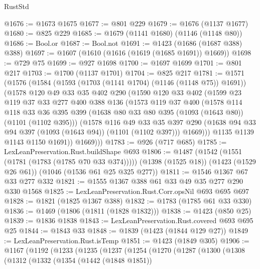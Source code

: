 \begin{lexlean}{RustStd}
\begin{coremodule}
@1676 := @1673 @1675
@1677 := @801 @229
@1679 := @1676 (@1137 @1677)
@1680 := @825 @229
@1685 := @1679 (@1141 @1680) (@1146 (@1148 @80))
@1686 := Bool.or
@1687 := Bool.not
@1691 := @1423 (@1686 (@1687 @388) @388)
@1697 := @1607 (@1610 (@1616 (@1619 (@1685 @1691)) @1669))
@1698 := @729 @75
@1699 := @927 @1698
@1700 := @1697 @1699
@1701 := @801 @217
@1703 := @1700 (@1137 @1701)
@1704 := @825 @217
@1781 := @1571
    (@1576
      (@1584
        (@1593 (@1703 (@1141 @1704) (@1146 (@1148 @75)) @1691))
        (@1578
          @120
          @49
          @33
          @35
          @402
          @290
          (@1590
            @120
            @33
            @402
            (@1599
              @23
              @119
              @37
              @33
              @277
              @400
              @388
              @136
              (@1573
                @119
                @37
                @400
                (@1578
                  @114
                  @118
                  @33
                  @36
                  @395
                  @399
                  (@1638 @80 @33 @80 @395 (@1093 (@1643 @80)) (@1101 (@1102 @395)))
                  (@1578
                    @116
                    @49
                    @33
                    @35
                    @397
                    @290
                    (@1638 @94 @33 @94 @397 (@1093 (@1643 @94)) (@1101 (@1102 @397)))
                    @1669)))
              @1135
              @1139
              @1143
              @1150
              @1691))
          @1669)))
@1783 := @926 (@717 @685)
@1785 := LexLeanPreservation.Rust.buildShape @693
@1806 := @1487
    (@1542 (@1551 (@1781 (@1783 (@1785 @70 @33 @374)))))
    (@1398 (@1525 @18))
    (@1423 (@1529 @26 @61))
    (@1046 (@1536 @61 @25 @325 @277))
@1811 := @1546 @1367 @67 @33 @277 @332
@1821 := @1555 @1367 @388 @61 @33 @49 @35 @277 @290 @330 @1568
@1825 := LexLeanPreservation.Rust.Corr.opsNil @693 @695 @697
@1828 := @1821 (@1825 @1367 @388)
@1832 := @1783 (@1785 @61 @33 @330)
@1836 := @1469 (@1806 (@1811 (@1828 @1832)))
@1838 := @1423 (@850 @25)
@1839 := @1836 @1838
@1843 := LexLeanPreservation.Rust.covered @693 @695 @25
@1844 := @1843 @33
@1848 := @1839 (@1423 (@1844 @129 @27))
@1849 := LexLeanPreservation.Rust.isTemp
@1851 := @1423 (@1849 @305)
@1906 := @1167
    (@1192
      (@1233
        (@1235
          (@1237
            (@1254
              (@1270
                (@1287
                  (@1300
                    (@1308
                      (@1312
                        (@1332
                          (@1354
                            (@1442 (@1848 @1851))

\end{coremodule}
\end{lexlean}
